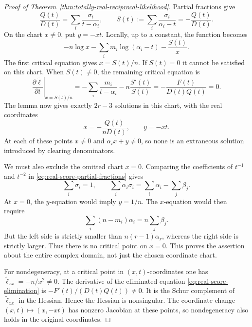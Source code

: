\begin{proof}[Proof of Theorem~\ref{thm:totally-real-reciprocal-likelihood}]
Partial fractions give
\begin{equation}\label{eq:real-score-partial-fractions}
 \frac{Q(t)}{D(t)}=\sum_i\frac{\sigma_i}{t-\alpha_i},
 \qquad S(t):=\sum_i\frac{\sigma_i}{\alpha_i-t}
                         =-\frac{Q(t)}{D(t)}.
\end{equation}
On the chart \(x\ne0\), put \(y=-xt\).  Locally, up to a
constant, the function becomes
\[
 -n\log x-\sum_i m_i\log(\alpha_i-t)-\frac{S(t)}x.
\]
The first critical equation gives \(x=S(t)/n\).  If \(S(t)=0\)
it cannot be satisfied on this chart.  When \(S(t)\ne0\), the
remaining critical equation is
\begin{equation}\label{eq:real-score-elimination}
 \left.\frac{\partial\widetilde\ell}{\partial t}\right|_{x=S(t)/n}
 =-\sum_i\frac{m_i}{t-\alpha_i}-n\frac{S'(t)}{S(t)}
 =-\frac{F(t)}{D(t)Q(t)}=0.
\end{equation}
The lemma now gives exactly \(2r-3\) solutions in this chart,
with the real coordinates
\begin{equation}\label{eq:real-critical-coordinate-formula}
                  x=-\frac{Q(t)}{nD(t)},\qquad y=-xt.
\end{equation}
At each of these points \(x\ne0\) and
\(\alpha_i x+y\ne0\), so none is an extraneous solution
introduced by clearing denominators.

We must also exclude the omitted chart \(x=0\).  Comparing the
coefficients of \(t^{-1}\) and \(t^{-2}\) in
\eqref{eq:real-score-partial-fractions} gives
\[
 \sum_i\sigma_i=1,
 \qquad
 \sum_i\alpha_i\sigma_i=\sum_i\alpha_i-\sum_j\beta_j.
\]
At \(x=0\), the \(y\)-equation would imply \(y=1/n\).
The \(x\)-equation would then require
\begin{equation}\label{eq:excluded-score-chart}
                 \sum_i(n-m_i)\alpha_i=n\sum_j\beta_j.
\end{equation}
But the left side is strictly smaller than
\(n(r-1)\alpha_r\), whereas the right side is strictly larger.
Thus there is no critical point on \(x=0\).  This proves the
assertion about the entire complex domain, not just the chosen
coordinate chart.

For nondegeneracy, at a critical point in \((x,t)\)-coordinates
one has \(\widetilde\ell_{xx}=-n/x^2\ne0\).  The derivative of
the eliminated equation \eqref{eq:real-score-elimination} is
\(-F'(t)/(D(t)Q(t))\ne0\).  It is the Schur complement of
\(\widetilde\ell_{xx}\) in the Hessian.  Hence the Hessian is
nonsingular.  The coordinate change \((x,t)\mapsto(x,-xt)\)
has nonzero Jacobian at these points, so nondegeneracy also holds
in the original coordinates.


\end{proof}
